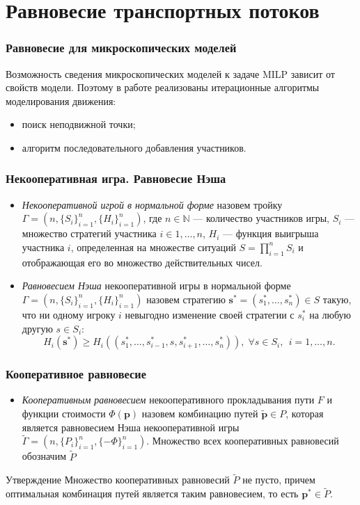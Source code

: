 \documentclass{beamer}
\begin{document}
\section{Равновесие транспортных потоков}

\begin{frame}\frametitle{Равновесие для микроскопических моделей}
	Возможность сведения микроскопических моделей к задаче MILP зависит от свойств модели. Поэтому в работе реализованы итерационные алгоритмы моделирования движения:
	\begin{itemize}    
		\item поиск неподвижной точки;
		\item алгоритм последовательного добавления участников.
	\end{itemize}
\end{frame}


\begin{frame}\frametitle{Некооперативная игра. Равновесие Нэша}
\begin{itemize}
\item \textit{Некооперативной игрой в нормальной форме} назовем тройку $\Gamma = (n, \{S_i\}_{i = 1}^n, \{H_i\}_{i = 1}^n)$, где $n \in \mathbb{N}$ --- количество участников игры, $S_i$ --- множество стратегий участника $i \in {1, \dots, n}$, $H_i$ --- функция выигрыша участника $i$, определенная на множестве ситуаций $S = \prod\limits_{i = 1}^n S_i$ и отображающая его во множество действительных чисел.
\item \textit{Равновесием Нэша} некооперативной игры в нормальной форме $\Gamma = (n, \{S_i\}_{i = 1}^n, \{H_i\}_{i = 1}^n)$ назовем стратегию $\textbf{s}^* = (s^*_1,\dots, s^*_n) \in S$ такую, что ни одному игроку $i$ невыгодно изменение своей стратегии с $s_i^*$ на любую другую $s \in S_i$:
$$H_i(\textbf{s}^*) \ge H_i(\left(s^*_1, \ldots, s^*_{i - 1}, s, s^*_{i + 1}, \ldots, s^*_{n} \right)), \; \forall s \in S_i, \; \, i = 1, \dots, n. $$ 
\end{itemize}
\end{frame}

\begin{frame}\frametitle{Кооперативное равновесие}
\begin{itemize}
\item \textit{Кооперативным равновесием} некооперативного прокладывания пути $F$ и функции стоимости $\Phi (\textbf{p})$ назовем комбинацию путей $\widetilde{\textbf{p}} \in P$, которая является равновесием Нэша некооперативной игры $\widetilde{\Gamma} = (n, \{P_i\}_{i = 1}^n, \{-\Phi\}_{i = 1}^n)$. Множество всех кооперативных равновесий обозначим $\widetilde{P}$
\end{itemize}

\begin{block}{Утверждение} 
Множество кооперативных равновесий $\widetilde{P}$ не пусто, причем
оптимальная комбинация путей является таким равновесием, то есть $\textbf{p}^* \in \widetilde{P}$.
\end{block}

\end{frame}
\end{document}
